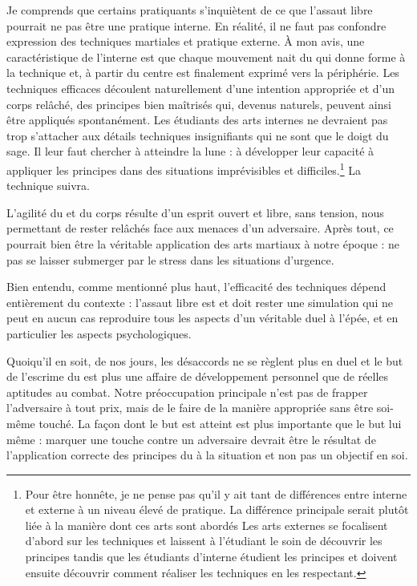 Je comprends que certains pratiquants s'inquiètent de ce que l'assaut libre pourrait ne pas être une pratique interne. 
En réalité, il ne faut pas confondre expression des techniques martiales et pratique externe.
\`{A} mon avis, une caractéristique de l'interne est que chaque mouvement nait du \Yi{} qui donne forme à la technique et, à partir du centre est finalement exprimé vers la périphérie. Les techniques efficaces découlent naturellement d'une intention appropriée et d'un corps relâché, des principes bien maîtrisés qui, devenus naturels, peuvent ainsi être appliqués spontanément.
Les étudiants des arts internes ne devraient pas trop s'attacher aux détails techniques insignifiants qui ne sont que le doigt du sage.
Il leur faut chercher à atteindre la lune : à développer leur capacité à appliquer les principes dans des situations imprévisibles et difficiles.\footnote{Pour être honnête, je ne pense pas qu'il y ait tant de différences entre interne et externe à un niveau élevé de pratique. La différence principale serait plutôt liée à la manière dont ces arts sont abordés Les arts externes se focalisent d'abord sur les techniques et laissent à l'étudiant le soin de découvrir les principes tandis que les étudiants d'interne étudient les principes et doivent ensuite découvrir comment réaliser les techniques en les respectant.}
La technique suivra. 

L'agilité du \Yi{} et du corps résulte d'un esprit ouvert et libre, sans tension, nous permettant de rester relâchés face aux menaces d'un adversaire.
Après tout, ce pourrait bien être la véritable application des arts martiaux à notre époque : ne pas se laisser submerger par le stress dans les situations d'urgence.

Bien entendu, comme mentionné plus haut, l'efficacité des techniques dépend entièrement du contexte : l'assaut libre est \textendash{} et doit rester \textendash{} une simulation qui ne peut en aucun cas reproduire tous les aspects d'un véritable duel à l'épée, et en particulier les aspects psychologiques.

Quoiqu'il en soit, de nos jours, les désaccords ne se règlent plus en duel et le but de l'escrime du \Taiji{} est plus une affaire de développement personnel que de réelles aptitudes au combat. Notre préoccupation principale n'est pas de frapper l'adversaire à tout prix, mais de le faire de la manière appropriée sans être soi-même touché. La façon dont le but est atteint est plus importante que le but lui même : marquer une touche contre un adversaire devrait être le résultat de l'application correcte des principes du \Taiji{} à la situation et non pas un objectif en soi.

